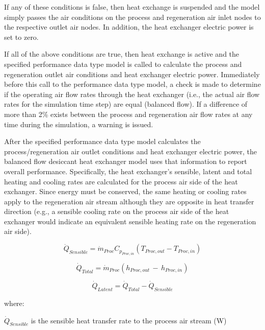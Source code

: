 If any of these conditions is false, then heat exchange is suspended and the model simply passes the air conditions on the process and regeneration air inlet nodes to the respective outlet air nodes. In addition, the heat exchanger electric power is set to zero.

If all of the above conditions are true, then heat exchange is active and the specified performance data type model is called to calculate the process and regeneration outlet air conditions and heat exchanger electric power. Immediately before this call to the performance data type model, a check is made to determine if the operating air flow rates through the heat exchanger (i.e., the actual air flow rates for the simulation time step) are equal (balanced flow). If a difference of more than 2\% exists between the process and regeneration air flow rates at any time during the simulation, a warning is issued.

After the specified performance data type model calculates the process/regeneration air outlet conditions and heat exchanger electric power, the balanced flow desiccant heat exchanger model uses that information to report overall performance. Specifically, the heat exchanger's sensible, latent and total heating and cooling rates are calculated for the process air side of the heat exchanger. Since energy must be conserved, the same heating or cooling rates apply to the regeneration air stream although they are opposite in heat transfer direction (e.g., a sensible cooling rate on the process air side of the heat exchanger would indicate an equivalent sensible heating rate on the regeneration air side).

\begin{equation}
{\dot{Q}_{Sensible}} = {\dot{m}_{Proc}} {C_{p_{Proc,in}}} \left( {{T_{Proc,out}} - {T_{Proc,in}}} \right)
\end{equation}

\begin{equation}
{\dot{Q}_{Total}} = {\dot{m}_{Proc}}\left( {{h_{Proc,out}}\, - \,{h_{Proc,in}}} \right)
\end{equation}

\begin{equation}
{\dot{Q}_{Latent}} = {\dot{Q}_{Total}} - {\dot{Q}_{Sensible}}
\end{equation}

where:

\({\dot{Q}_{Sensible}}\) is the sensible heat transfer rate to the process air stream (W)

